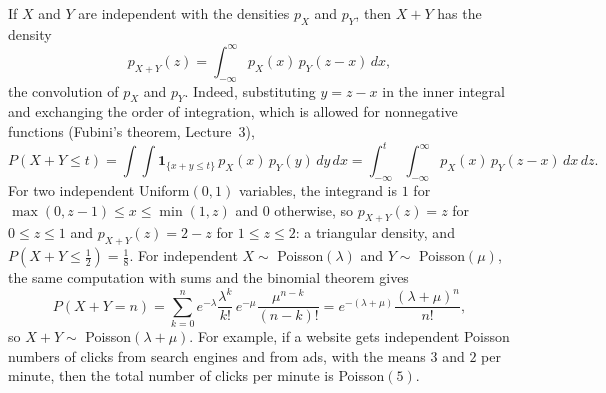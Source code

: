 \begin{example}\label{L4-ex:convolution}
    If $X$ and $Y$ are independent with the densities $p_X$ and $p_Y$, then $X + Y$ has the density
    \[p_{X+Y}(z) = \int_{-\infty}^\infty p_X(x)\,p_Y(z - x)\, dx,\]
    the convolution of $p_X$ and $p_Y$. Indeed, substituting $y = z - x$ in the inner integral and exchanging the order of integration, which is allowed for nonnegative functions (Fubini's theorem, Lecture~3),
    \[P(X + Y \leq t) = \int\!\!\int \mathbf{1}_{\{x + y \leq t\}}\,p_X(x)\,p_Y(y)\, dy\, dx = \int_{-\infty}^t \int_{-\infty}^\infty p_X(x)\,p_Y(z - x)\, dx\, dz.\]
    For two independent Uniform$(0, 1)$ variables, the integrand is $1$ for $\max(0, z - 1) \leq x \leq \min(1, z)$ and $0$ otherwise, so $p_{X+Y}(z) = z$ for $0 \leq z \leq 1$ and $p_{X+Y}(z) = 2 - z$ for $1 \leq z \leq 2$: a triangular density, and $P(X + Y \leq \frac{1}{2}) = \frac{1}{8}$. For independent $X \sim$ Poisson$(\lambda)$ and $Y \sim$ Poisson$(\mu)$, the same computation with sums and the binomial theorem gives
    \[P(X + Y = n) = \sum_{k=0}^n e^{-\lambda}\frac{\lambda^k}{k!}\,e^{-\mu}\frac{\mu^{n-k}}{(n - k)!} = e^{-(\lambda + \mu)}\frac{(\lambda + \mu)^n}{n!},\]
    so $X + Y \sim$ Poisson$(\lambda + \mu)$. For example, if a website gets independent Poisson numbers of clicks from search engines and from ads, with the means $3$ and $2$ per minute, then the total number of clicks per minute is Poisson$(5)$.
\end{example}

